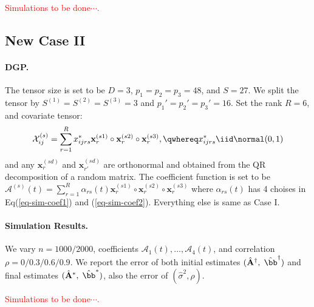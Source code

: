 \documentclass[10pt]{notes}
\begin{document}
\noindent
\textcolor{red}{Simulations to be done$\cdots$.}


\subsection{New Case II}
\paragraph*{DGP.}
The tensor size is set to be $D=3$, $p_1=p_2=p_3=48$, and $S=27$. We split the tensor by $S^{(1)}=S^{(2)}=S^{(3)}=3$ and $p_1'=p_2'=p_3'=16$. Set the rank $R=6$, and covariate tensor:
\begin{align*}
    \mathcal{X}_{ij}^{(s)}=\sum_{r=1}^{R}x^*_{ijrs}\mathbf{x}_{r}^{(s1)}\circ\mathbf{x}_{r}^{(s2)}\circ\mathbf{x}_{r}^{(s3)},
    \qwhereq
    x_{ijrs}^*\iid \normal(0,1)
\end{align*}
and any $\mathbf{x}_{r}^{(sd)}$ and $\mathbf{x}_{r'}^{(sd)}$ are orthonormal and obtained from the QR decomposition of a random matrix. The coefficient function is set to be $\mathcal{A}^{(s)}(t)=\sum_{r=1}^{R} \alpha_{rs}(t)\mathbf{x}_r^{(s1)}\circ \mathbf{x}_r^{(s2)}\circ\mathbf{x}_{r}^{(s3)}$ where $\alpha_{rs}(t)$ has 4 choises in Eq(\ref{eq-sim-coef1}) and (\ref{eq-sim-coef2}). Everything else is same as Case I.

\paragraph{Simulation Results.} We vary $n=1000/2000$, coefficients $\mathcal{A}_1(t),\dots,\mathcal{A}_4(t)$, and correlation $\rho=0/0.3/0.6/0.9$. We report the error of both initial estimates $(\hat{\mathbf{A}}^\dagger,\;\hat{\bb}^\dagger)$ and final estimates $(\hat{\mathbf{A}}^*,\;\hat{\bb}^*)$, also the error of $(\hat{\sigma}^2, \hat{\rho})$.

\noindent
\textcolor{red}{Simulations to be done$\cdots$.}
\end{document}
